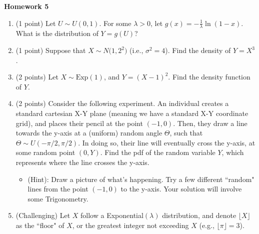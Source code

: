 \documentclass[10pt,twoside]{article}\usepackage[]{graphicx}\usepackage[dvipsnames,svgnames,table]{xcolor}
\newcommand{\floor}[1]{\lfloor #1 \rfloor}
\begin{document}
\begin{flushright}
\begin{minipage}{.33\textwidth}
\rightline{\today}
\end{minipage}
\end{flushright}

\begin{center}
{\large{\textbf{Homework 5}}}
\end{center}

\begin{enumerate}

    \item (1 point) Let $U \sim U(0, 1)$. For some $\lambda > 0$, let $g(x) = -\frac{1}{\lambda} \ln (1-x)$. What is the distribution of $Y = g(U)$?

    \item (1 point) Suppose that $X \sim N\big(1, 2^2\big)$ (i.e., $\sigma^2 = 4$). Find the density of $Y = X^3$.

    \item (2 points) Let $X \sim \text{Exp}(1)$, and $Y = (X - 1)^2$. Find the density function of $Y$. 

    \item (2 points) Consider the following experiment. An individual creates a standard cartesian X-Y plane (meaning we have a standard X-Y coordinate grid), and places their pencil at the point $(-1, 0)$. 
    Then, they draw a line towards the y-axis at a (uniform) random angle $\Theta$, such that $\Theta \sim U(-\pi/2, \pi/2)$.
    In doing so, their line will eventually cross the y-axis, at some random point $(0, Y)$. Find the pdf of the random variable $Y$, which represents where the line crosses the y-axis.
    
    \begin{itemize}
      \item (Hint): Draw a picture of what's happening. Try a few different ``random" lines from the point $(-1, 0)$ to the y-axis. Your solution will involve some Trigonometry. 
    \end{itemize}

    \item (Challenging) Let $X$ follow a Exponential$(\lambda)$ distribution, and denote $\floor{X}$ as the ``floor" of $X$, or the greatest integer not exceeding $X$ (e.g., $\floor{\pi} = 3$). 
    

\end{enumerate}
\end{document}

